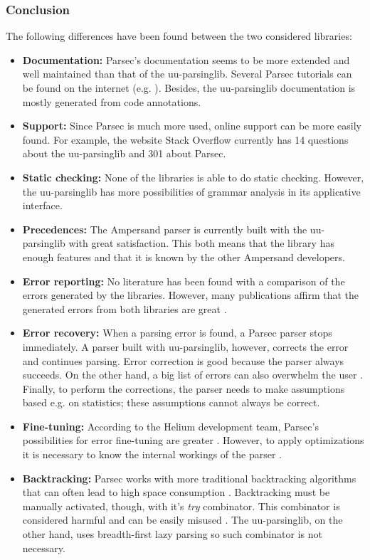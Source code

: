 \subsubsection{Conclusion}
The following differences have been found between the two considered libraries:
\begin{itemize}
	\item \textbf{Documentation:} Parsec's documentation seems to be more extended and well maintained than that of the uu-parsinglib.
		Several Parsec tutorials can be found on the internet (e.g. ).
		Besides, the uu-parsinglib documentation is mostly generated from code annotations.
	\item \textbf{Support:} Since Parsec is much more used, online support can be more easily found.
		For example, the website Stack Overflow currently has 14 questions about the uu-parsinglib and 301 about Parsec.
	\item \textbf{Static checking:} None of the libraries is able to do static checking.
		However, the uu-parsinglib has more possibilities of grammar analysis in its applicative interface.
	\item \textbf{Precedences:} The Ampersand parser is currently built with the uu-parsinglib with great satisfaction.
		This both means that the library has enough features and that it is known by the other Ampersand developers.
	\item \textbf{Error reporting:} No literature has been found with a comparison of the errors generated by the libraries.
		However, many publications affirm that the generated errors from both libraries are great .
	\item \textbf{Error recovery:} When a parsing error is found, a Parsec parser stops immediately.
		A parser built with uu-parsinglib, however, corrects the error and continues parsing.
		Error correction is good because the parser always succeeds.
		On the other hand, a big list of errors can also overwhelm the user .
		Finally, to perform the corrections, the parser needs to make assumptions based e.g. on statistics;
		these assumptions cannot always be correct.
	\item \textbf{Fine-tuning:} According to the Helium development team, Parsec's possibilities for error fine-tuning are greater .
		However, to apply optimizations it is necessary to know the internal workings of the parser .
	\item \textbf{Backtracking:} Parsec works with more traditional backtracking algorithms  that can often lead to high space consumption .
		Backtracking must be manually activated, though, with it's \textit{try} combinator.
    This combinator is considered harmful and can be easily misused .
		The uu-parsinglib, on the other hand, uses breadth-first lazy parsing  so such combinator is not necessary.
    

\end{itemize}
